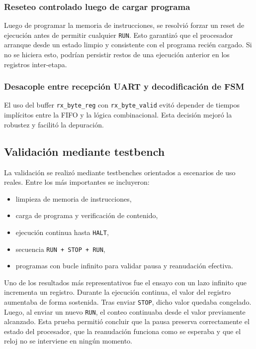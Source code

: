\subsubsection{Reseteo controlado luego de cargar programa}

Luego de programar la memoria de instrucciones, se resolvió forzar un reset de ejecución antes de permitir cualquier \texttt{RUN}. Esto garantizó que el procesador arranque desde un estado limpio y consistente con el programa recién cargado. Si no se hiciera esto, podrían persistir restos de una ejecución anterior en los registros inter-etapa.

\subsubsection{Desacople entre recepción UART y decodificación de FSM}

El uso del buffer \texttt{rx\_byte\_reg} con \texttt{rx\_byte\_valid} evitó depender de tiempos implícitos entre la FIFO y la lógica combinacional. Esta decisión mejoró la robustez y facilitó la depuración.

\subsection{Validación mediante testbench}

La validación se realizó mediante testbenches orientados a escenarios de uso reales. Entre los más importantes se incluyeron:

\begin{itemize}
    \item limpieza de memoria de instrucciones,
    \item carga de programa y verificación de contenido,
    \item ejecución continua hasta \texttt{HALT},
    \item secuencia \texttt{RUN + STOP + RUN},
    \item programas con bucle infinito para validar pausa y reanudación efectiva.
\end{itemize}

Uno de los resultados más representativos fue el ensayo con un lazo infinito que incrementa un registro. Durante la ejecución continua, el valor del registro aumentaba de forma sostenida. Tras enviar \texttt{STOP}, dicho valor quedaba congelado. Luego, al enviar un nuevo \texttt{RUN}, el conteo continuaba desde el valor previamente alcanzado. Esta prueba permitió concluir que la pausa preserva correctamente el estado del procesador, que la reanudación funciona como se esperaba y que el reloj no se interviene en ningún momento.
